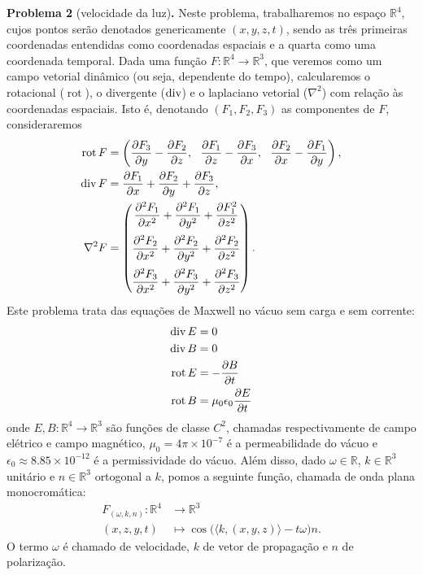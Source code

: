 \documentclass[11pt]{article}
\newcommand{\R}{\mathbb R}
\providecommand{\div}{}\renewcommand{\div}{\mathop{\rm div}\nolimits}
\DeclareMathOperator{\rot}{rot}
\begin{document}
\noindent\textbf{Problema 2} (velocidade da luz)\textbf{.} 
Neste problema, trabalharemos no espaço $\R^4$, cujos pontos serão denotados genericamente $(x,y,z,t)$, sendo as três primeiras coordenadas entendidas como coordenadas espaciais e a quarta como uma coordenada temporal.
Dada uma função $F\colon\R^4\rightarrow\R^3$, que veremos como um campo vetorial dinâmico (ou seja, dependente do tempo), calcularemos o rotacional ($\rot$), o divergente ($\div$) e o laplaciano vetorial ($\nabla^2$) com relação às coordenadas espaciais.
Isto é, denotando $(F_1,F_2,F_3)$ as componentes de $F$, consideraremos
\begin{align*}
\rot F &= \left(
\frac{\partial F_3}{\partial y}-\frac{\partial F_2}{\partial z},~~
\frac{\partial F_1}{\partial z}-\frac{\partial F_3}{\partial x},~~ \frac{\partial F_2}{\partial x}-\frac{\partial F_1}{\partial y}
\right),\\
\div F &= \frac{\partial F_1}{\partial x} + \frac{\partial F_2}{\partial y} + \frac{\partial F_3}{\partial z},\\
\nabla^2 F &= 
\begin{pmatrix}
\dfrac{\partial^2 F_1}{\partial x^2}+\dfrac{\partial^2 F_1}{\partial y^2}+\dfrac{\partial F_1^2}{\partial z^2}\vspace{.2cm}
\\
\dfrac{\partial^2 F_2}{\partial x^2}+\dfrac{\partial^2 F_2}{\partial y^2}+\dfrac{\partial^2 F_2}{\partial z^2}\vspace{.2cm}
\\
\dfrac{\partial^2 F_3}{\partial x^2}+\dfrac{\partial^2 F_3}{\partial y^2}+\dfrac{\partial^2 F_3}{\partial z^2}
\end{pmatrix}.
\end{align*}
Este problema trata das equações de Maxwell no vácuo sem carga e sem corrente:
\begin{align}
\div E &= 0 \label{eq:testeI_maxwell_1}\\
\div B &= 0 \label{eq:testeI_maxwell_2}\\
\rot E &= -\dfrac{\partial B}{\partial t} \label{eq:testeI_maxwell_3}\\
\rot B &= \mu_0\epsilon_0 \dfrac{\partial E}{\partial t} \label{eq:testeI_maxwell_4}
\end{align}
onde $E,B\colon\R^4\rightarrow\R^3$ são funções de classe $C^2$, chamadas respectivamente de campo elétrico e campo magnético, $\mu_0 = 4\pi\times10^{-7}$ é a permeabilidade do vácuo e $\epsilon_0 \approx 8.85\times10^{-12}$ é a permissividade do vácuo.
Além disso, dado $\omega\in\R$, $k\in\R^3$ unitário e $n\in\R^3$ ortogonal a $k$, pomos a seguinte função, chamada de onda plana monocromática:
\begin{align}
F_{(\omega, k, n)}\colon \R^4&\longrightarrow\R^3 \label{eq:onda_plana}\\
(x,z,y,t)&\longmapsto \cos\big( \big\langle k, (x,y,z) \big\rangle - t\omega \big) n.\nonumber
\end{align}
O termo $\omega$ é chamado de velocidade, $k$ de vetor de propagação e $n$ de polarização.
\end{document}
